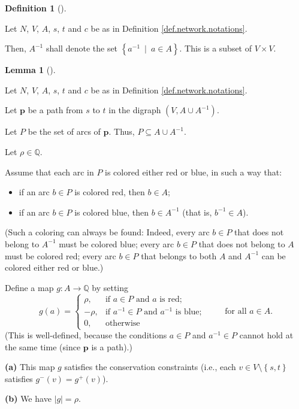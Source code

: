 \documentclass[numbers=enddot,12pt,final,onecolumn,notitlepage]{scrartcl}%
\theoremstyle{definition}
\newtheorem{lem}[theo]{Lemma}
\newenvironment{lemma}[1][]
{\begin{lem}[#1]\begin{leftbar}}
{\end{leftbar}\end{lem}}
\newtheorem{defi}[theo]{Definition}
\newenvironment{definition}[1][]
{\begin{defi}[#1]\begin{leftbar}}
{\end{leftbar}\end{defi}}
\begin{document}
\begin{definition}
\label{def.A-}Let $N$, $V$, $A$, $s$, $t$ and $c$ be as in Definition
\ref{def.network.notations}.

Then, $A^{-1}$ shall denote the set $\left\{  a^{-1}\ \mid\ a\in A\right\}  $.
This is a subset of $V\times V$.
\end{definition}

\begin{lemma}
\label{lem.6}Let $N$, $V$, $A$, $s$, $t$ and $c$ be as in Definition
\ref{def.network.notations}.

Let $\mathbf{p}$ be a path from $s$ to $t$ in the digraph $\left(  V,A\cup
A^{-1}\right)  $.

Let $P$ be the set of arcs of $\mathbf{p}$. Thus, $P\subseteq A\cup A^{-1}$.

Let $\rho\in\mathbb{Q}$.

Assume that each arc in $P$ is colored either red or blue, in such a way that:

\begin{itemize}
\item if an arc $b\in P$ is colored red, then $b\in A$;

\item if an arc $b\in P$ is colored blue, then $b\in A^{-1}$ (that is,
$b^{-1}\in A$).
\end{itemize}

(Such a coloring can always be found: Indeed, every arc $b\in P$ that does not
belong to $A^{-1}$ must be colored blue; every arc $b\in P$ that does not
belong to $A$ must be colored red; every arc $b\in P$ that belongs to both $A$
and $A^{-1}$ can be colored either red or blue.)

Define a map $g:A\rightarrow\mathbb{Q}$ by setting%
\[
g\left(  a\right)  =%
\begin{cases}
\rho, & \text{if }a\in P\text{ and }a\text{ is red};\\
-\rho, & \text{if }a^{-1}\in P\text{ and }a^{-1}\text{ is blue};\\
0, & \text{otherwise}%
\end{cases}
\ \ \ \ \ \ \ \ \ \ \text{for all }a\in A.
\]
(This is well-defined, because the conditions $a\in P$ and $a^{-1}\in P$
cannot hold at the same time (since $\mathbf{p}$ is a path).)

\textbf{(a)} This map $g$ satisfies the conservation constraints (i.e., each
$v\in V\setminus\left\{  s,t\right\}  $ satisfies $g^{-}\left(  v\right)
=g^{+}\left(  v\right)  $).

\textbf{(b)} We have $\left\vert g\right\vert =\rho$.
\end{lemma}
\end{document}
